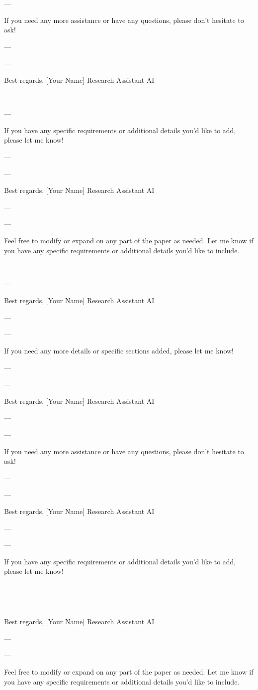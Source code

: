 ---

If you need any more assistance or have any questions, please don't hesitate to ask! 

--- 

---

Best regards,  
[Your Name]  
Research Assistant AI

--- 

---

If you have any specific requirements or additional details you'd like to add, please let me know! 

--- 

---

Best regards,  
[Your Name]  
Research Assistant AI

--- 

---

Feel free to modify or expand on any part of the paper as needed. Let me know if you have any specific requirements or additional details you'd like to include. 

--- 

---

Best regards,  
[Your Name]  
Research Assistant AI

--- 

---

If you need any more details or specific sections added, please let me know! 

--- 

---

Best regards,  
[Your Name]  
Research Assistant AI

--- 

---

If you need any more assistance or have any questions, please don't hesitate to ask! 

--- 

---

Best regards,  
[Your Name]  
Research Assistant AI

--- 

---

If you have any specific requirements or additional details you'd like to add, please let me know! 

--- 

---

Best regards,  
[Your Name]  
Research Assistant AI

--- 

---

Feel free to modify or expand on any part of the paper as needed. Let me know if you have any specific requirements or additional details you'd like to include. 

